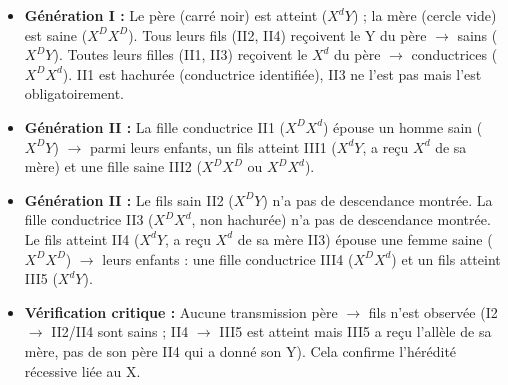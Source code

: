 \documentclass[11pt]{article}
\begin{document}
\begin{exemplebox}
\begin{itemize}
\item \textbf{Génération I :} Le père (carré noir) est atteint ($X^d Y$) ; la mère (cercle vide) est saine ($X^D X^D$). Tous leurs fils (II2, II4) reçoivent le Y du père $\rightarrow$ sains ($X^D Y$). Toutes leurs filles (II1, II3) reçoivent le $X^d$ du père $\rightarrow$ conductrices ($X^D X^d$). II1 est hachurée (conductrice identifiée), II3 ne l'est pas mais l'est obligatoirement.
\item \textbf{Génération II :} La fille conductrice II1 ($X^D X^d$) épouse un homme sain ($X^D Y$) $\rightarrow$ parmi leurs enfants, un fils atteint III1 ($X^d Y$, a reçu $X^d$ de sa mère) et une fille saine III2 ($X^D X^D$ ou $X^D X^d$).
\item \textbf{Génération II :} Le fils sain II2 ($X^D Y$) n'a pas de descendance montrée. La fille conductrice II3 ($X^D X^d$, non hachurée) n'a pas de descendance montrée. Le fils atteint II4 ($X^d Y$, a reçu $X^d$ de sa mère II3) épouse une femme saine ($X^D X^D$) $\rightarrow$ leurs enfants : une fille conductrice III4 ($X^D X^d$) et un fils atteint III5 ($X^d Y$).
\item \textbf{Vérification critique :} Aucune transmission père $\rightarrow$ fils n'est observée (I2 $\rightarrow$ II2/II4 sont sains ; II4 $\rightarrow$ III5 est atteint mais III5 a reçu l'allèle de sa mère, pas de son père II4 qui a donné son Y). Cela confirme l'hérédité récessive liée au X.
\end{itemize}
\end{exemplebox}
\end{document}
